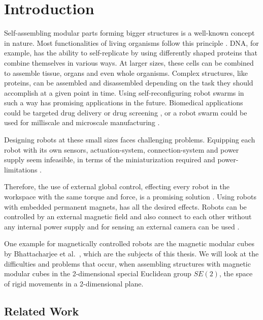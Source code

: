 \chapter{Introduction}
\label{chap:intro}

Self-assembling modular parts forming bigger structures is a well-known concept in nature.
Most functionalities of living organisms follow this principle \cite{bishop2005}.
DNA, for example, has the ability to self-replicate by using differently shaped proteins that combine themselves in various ways.
At larger sizes, these cells can be combined to assemble tissue, organs and even whole organisms.
Complex structures, like proteins, can be assembled and disassembled depending on the task they should accomplish at a given point in time. 
Using self-reconfiguring robot swarms in such a way has promising applications in the future.
Biomedical applications could be targeted drug delivery or drug screening \cite{sitti2015}, or a robot swarm could be used for milliscale and microscale manufacturing \cite{pelrine2016}.

Designing robots at these small sizes faces challenging problems.
Equipping each robot with its own sensors, actuation-system, connection-system and power supply seem infeasible, in terms of the miniaturization required and power-limitations \cite{white2007}.

Therefore, the use of external global control, effecting every robot in the workspace with the same torque and force, is a promising solution \cite{white2007}.
Using robots with embedded permanent magnets, has all the desired effects.
Robots can be controlled by an external magnetic field and also connect to each other without any internal power supply and for sensing an external camera can be used \cite{saab2019}.

One example for magnetically controlled robots are the magnetic modular cubes by Bhattacharjee et al.\ \cite{Bhattacharjee2022}, which are the subjects of this thesis.
We will look at the difficulties and problems that occur, when assembling structures with magnetic modular cubes in the 2-dimensional special Euclidean group $\textit{SE}(2)$, the space of rigid movements in a 2-dimensional plane.

\section{Related Work}

